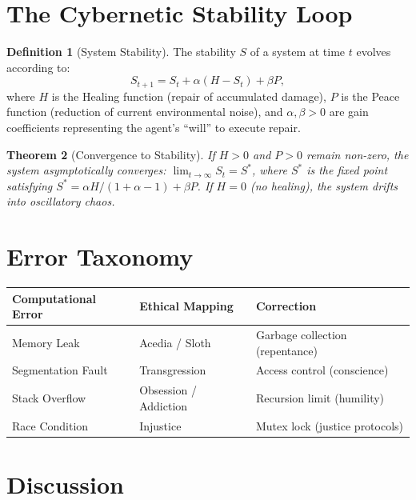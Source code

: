 \documentclass[12pt, a4paper]{article}
\theoremstyle{plain}
\newtheorem{theorem}{Theorem}[section]
\theoremstyle{definition}
\newtheorem{definition}[theorem]{Definition}
\begin{document}
\section{The Cybernetic Stability Loop}\label{sec:cybernetic}

\begin{definition}[System Stability]\label{def:stability}
  The stability $S$ of a system at time $t$ evolves according to:
  \begin{equation}\label{eq:stability}
    S_{t+1} = S_t + \alpha(H - S_t) + \beta P,
  \end{equation}
  where $H$ is the Healing function (repair of accumulated damage),
  $P$ is the Peace function (reduction of current environmental noise),
  and $\alpha, \beta > 0$ are gain coefficients representing the agent's
  ``will'' to execute repair.
\end{definition}

\begin{theorem}[Convergence to Stability]\label{thm:convergence}
  If $H > 0$ and $P > 0$ remain non-zero, the system asymptotically
  converges: $\lim_{t \to \infty} S_t = S^*$, where $S^*$ is the fixed
  point satisfying $S^* = \alpha H / (1 + \alpha - 1) + \beta P$.
  If $H = 0$ (no healing), the system drifts into oscillatory chaos.
\end{theorem}

\section{Error Taxonomy}\label{sec:errors}

\begin{center}
\begin{tabular}{lll}
  \toprule
  \textbf{Computational Error} & \textbf{Ethical Mapping} & \textbf{Correction} \\
  \midrule
  Memory Leak & Acedia / Sloth & Garbage collection (repentance) \\
  Segmentation Fault & Transgression & Access control (conscience) \\
  Stack Overflow & Obsession / Addiction & Recursion limit (humility) \\
  Race Condition & Injustice & Mutex lock (justice protocols) \\
  \bottomrule
\end{tabular}
\end{center}

\section{Discussion}\label{sec:discussion}
\end{document}

